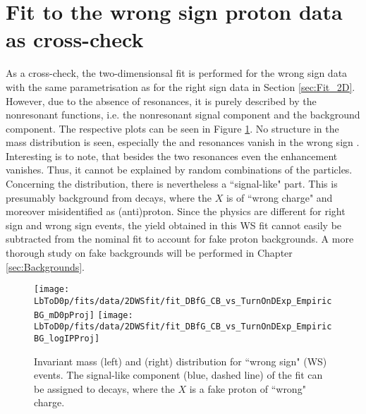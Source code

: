 \section{Fit to the wrong sign proton data as cross-check}
As a cross-check, the two-dimensionsal fit is performed for the wrong sign data with the same parametrisation as for the right sign data in Section \ref{sec:Fit_2D}.
However, due to the absence of resonances, it is purely described by the nonresonant functions, i.e. the nonresonant signal component and the background component.
The respective plots can be seen in Figure \ref{fig:fit_2D_WS}. 
No structure in the mass distribution is seen, especially the \LcResI and \LcResII resonances vanish in the wrong sign \Dz\proton.
Interesting is to note, that besides the two resonances even the enhancement vanishes.
Thus, it cannot be explained by random combinations of the particles.
Concerning the \logIP distribution, there is nevertheless a ``signal-like" part. 
This is presumably background from \BToDmunuX decays, where the $X$ is of ``wrong charge" and moreover misidentified as (anti)proton.
Since the physics are different for right sign and wrong sign events, the yield obtained in this WS fit cannot easily be subtracted from the nominal fit to account for fake proton backgrounds.
A more thorough study on fake backgrounds will be performed in Chapter \ref{sec:Backgrounds}.
\begin{figure}[tbp]
	\centering
	\texttt{[image: LbToD0p/fits/data/2DWSfit/fit\_DBfG\_CB\_vs\_TurnOnDExp\_EmpiricBG\_mD0pProj]}
	\texttt{[image: LbToD0p/fits/data/2DWSfit/fit\_DBfG\_CB\_vs\_TurnOnDExp\_EmpiricBG\_logIPProj]}
	\caption{Invariant \Dz\proton mass (left) and \logIP (right) distribution for ``wrong sign" (WS) events.
             The signal-like component (blue, dashed line) of the fit can be assigned to \BToDmunuX decays, where the $X$ is a fake proton of ``wrong" charge.}
	\label{fig:fit_2D_WS}
\end{figure}


